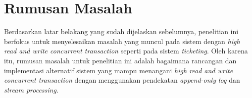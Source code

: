 \section{Rumusan Masalah}

Berdasarkan latar belakang yang sudah dijelaskan sebelumnya, penelitian ini berfokus untuk menyelesaikan masalah yang muncul pada sistem dengan \textit{high read and write concurrent transaction} seperti pada sistem \textit{ticketing}. Oleh karena itu, rumusan masalah untuk penelitian ini adalah bagaimana rancangan dan implementasi alternatif sistem yang mampu menangani \textit{high read and write concurrent transaction} dengan menggunakan pendekatan \textit{append-only log} dan \textit{stream processing}.
